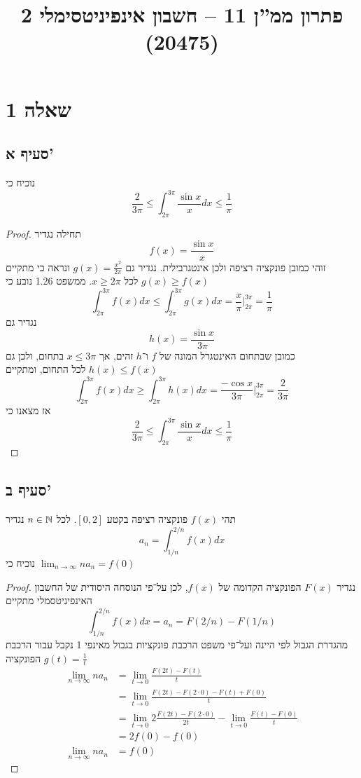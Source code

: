 
\title{פתרון ממ''ן 11 – חשבון אינפיניטסימלי 2 (20475)}


\maketitle
\maketitleprint{}
\section{שאלה 1}
\subsection{סעיף א'}
נוכיח כי
\[
	\frac{2}{3\pi} \le \int_{2\pi}^{3\pi} \frac{\sin x}{x} dx \le \frac{1}{\pi}
\]
\begin{proof}
	תחילה נגדיר
	\[
		f(x) = \frac{\sin x}{x}
	\]
	זוהי כמובן פונקציה רציפה ולכן אינטגרבילית.
	נגדיר גם $g(x) = \frac{x^2}{2\pi}$ ונראה כי מתקיים $g(x) \ge f(x)$ לכל $x \ge 2\pi$.
	ממשפט 1.26 נובע כי
	\[
		\int_{2\pi}^{3\pi} f(x) dx \le \int_{2\pi}^{3\pi} g(x) dx = \frac{x}{\pi} \Big|_{2\pi}^{3\pi} = \frac{1}{\pi}
	\]
	נגדיר גם
	\[
		h(x) = \frac{\sin x}{3 \pi}
	\]
	כמובן שבתחום האינטגרל המונה של $f$ ו־$h$ זהים, אך $x \le 3\pi$ בתחום, ולכן גם $h(x) \le f(x)$ לכל התחום, ומתקיים
	\[
		\int_{2\pi}^{3\pi} f(x) dx \ge \int_{2\pi}^{3\pi} h(x) dx = \frac{-\cos x}{3\pi} \Big|_{2\pi}^{3\pi} = \frac{2}{3\pi}
	\]
	אז מצאנו כי
	\[
		\frac{2}{3\pi} \le \int_{2\pi}^{3\pi} \frac{\sin x}{x} dx \le \frac{1}{\pi}
	\]
\end{proof}

\subsection{סעיף ב'}
תהי $f(x)$ פונקציה רציפה בקטע $[0, 2]$. לכל $n \in \mathbb{N}$ נגדיר
\[
	a_n = \int_{1/n}^{2/n} f(x) dx
\]
נוכיח כי $\lim_{n \to \infty} n a_n = f(0)$
\begin{proof}
	נגדיר $F(x)$ הפונקציה הקדומה של $f(x)$, לכן על־פי הנוסחה היסודית של החשבון האינפיניטסמלי מתקיים
	\[
		\int_{1/n}^{2/n} f(x) dx = a_n = F(2/n) - F(1/n)
	\]
	מהגדרת הגבול לפי היינה ועל־פי משפט הרכבת פונקציות בגבול מאינפי 1 נקבל עבור הרכבת הפונקציה $g(t) = \frac{1}{t}$
	\begin{align*}
		\lim_{n \to \infty} n a_n
		& = \lim_{t \to 0} \frac{F(2t) - F(t)}{t} \\
		& = \lim_{t \to 0} \frac{F(2t) - F(2 \cdot 0) - F(t) + F(0)}{t} \\
		& = \lim_{t \to 0} 2\frac{F(2t) - F(2 \cdot 0)}{2t} - \lim_{t \to 0} \frac{F(t) - F(0)}{t} \\
		& = 2 f(0) - f(0) \\ 
		\lim_{n \to \infty} n a_n
		& = f(0)
	\end{align*}
\end{proof}


